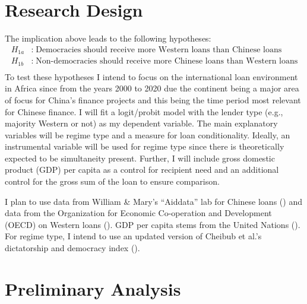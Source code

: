 \documentclass[12pt]{article}
\begin{document}
\section*{Research Design}
The implication above leads to the following hypotheses:
\begin{align*}
    H_{1a}&:\;\text{Democracies should receive more Western loans than Chinese loans}\\
    H_{1b}&:\;\text{Non-democracies should receive more Chinese loans than Western loans}\\
\end{align*}
To test these hypotheses I intend to focus on the international loan environment in Africa since from the years 2000 to 2020 due the continent being a major area of focus for China's finance projects and this being the time period most relevant for Chinese finance. I will fit a logit/probit model with the lender type (e.g., majority Western or not) as my dependent variable. The main explanatory variables will be regime type and a measure for loan conditionality. Ideally, an instrumental variable will be used for regime type since there is theoretically expected to be simultaneity present. Further, I will include gross domestic product (GDP) per capita as a control for recipient need and an additional control for the gross sum of the loan to ensure comparison.

I plan to use data from William \& Mary's ``Aiddata'' lab for Chinese loans (\cite{custer2021}) and data from the Organization for Economic Co-operation and Development (OECD) on Western loans (\cite{organizationforeconomicco-operationanddevelopment2022a}). GDP per capita stems from the United Nations (\cite{unitednationsstatisticsdivision2019}). For regime type, I intend to use an updated version of Cheibub et al.'s dictatorship and democracy index (\cite{cheibub2010}).

\section*{Preliminary Analysis}
\end{document}
